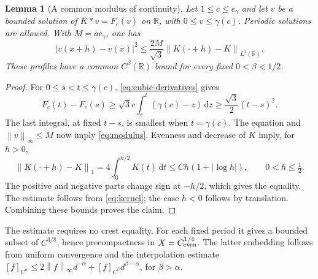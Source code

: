 \documentclass[11pt,a4paper]{article}
\newtheorem{lemma}[theorem]{Lemma}
\theoremstyle{remark}
\newcommand{\R}{\mathbb R}
\newcommand{\cg}{c_\gamma}
\newcommand{\dd}{\,\mathrm d}
\newcommand{\norm}[1]{\left\lVert#1\right\rVert}
\begin{document}
\begin{lemma}[A common modulus of continuity]\label{lem:modulus}
Let $1\le c\le\cg$ and let $v$ be a bounded solution of
$K*v=F_c(v)$ on $\R$, with $0\le v\le\gamma(c)$. Periodic solutions
are allowed. With $M=a\cg$, one has
\begin{equation}\label{eq:modulus}
 |v(x+h)-v(x)|^2\le\frac{2M}{\sqrt3}
            \norm{K(\cdot+h)-K}_{L^1(\R)}.
\end{equation}
These profiles have a common $C^\beta(\R)$ bound for every fixed
$0<\beta<1/2$.
\end{lemma}
\begin{proof}
For $0\le s<t\le\gamma(c)$, \eqref{eq:cubic-derivatives} gives
\[
 F_c(t)-F_c(s)\ge\sqrt3c\int_s^t(\gamma(c)-z)\dd z
              \ge\frac{\sqrt3}{2}(t-s)^2.
\]
The last integral, at fixed $t-s$, is smallest when $t=\gamma(c)$.
The equation and $\norm{v}_\infty\le M$ now imply
\eqref{eq:modulus}. Evenness and decrease of $K$ imply, for $h>0$,
\begin{equation}\label{eq:translation-norm}
 \norm{K(\cdot+h)-K}_1=4\int_0^{h/2}K(t)\dd t
                  \le C h(1+|\log h|),\qquad 0<h\le\tfrac12.
\end{equation}
The positive and negative parts change sign at $-h/2$, which gives the
equality. The estimate follows from \eqref{eq:kernel}; the case $h<0$
follows by translation. Combining these bounds proves the claim.
\end{proof}

The estimate requires no crest equality. For each fixed period it gives a
bounded subset of $C^{3/8}$, hence precompactness in $X=C^{1/4}_{\rm even}$.
The latter embedding follows from uniform convergence and the interpolation
estimate
$[f]_{C^\alpha}\le2\norm{f}_\infty d^{-\alpha}
 +[f]_{C^\beta}d^{\beta-\alpha}$, for $\beta>\alpha$.
\end{document}
